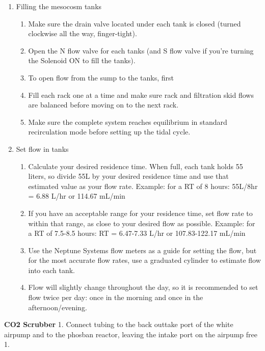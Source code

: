 \documentclass[]{book}
\providecommand{\tightlist}{%
  \setlength{\itemsep}{0pt}\setlength{\parskip}{0pt}}
\begin{document}
\begin{enumerate}
\def\labelenumi{\arabic{enumi}.}
\tightlist
\item
  Filling the mesocosm tanks

  \begin{enumerate}
  \def\labelenumii{\arabic{enumii}.}
  \tightlist
  \item
    Make sure the drain valve located under each tank is closed (turned
    clockwise all the way, finger-tight).
  \item
    Open the N flow valve for each tanks (and S flow valve if you're
    turning the Solenoid ON to fill the tanks).
  \item
    To open flow from the sump to the tanks, first
  \item
    Fill each rack one at a time and make sure rack and filtration skid
    flows are balanced before moving on to the next rack.
  \item
    Make sure the complete system reaches equilibrium in standard
    recirculation mode before setting up the tidal cycle.
  \end{enumerate}
\item
  Set flow in tanks

  \begin{enumerate}
  \def\labelenumii{\arabic{enumii}.}
  \tightlist
  \item
    Calculate your desired residence time. When full, each tank holds 55
    liters, so divide 55L by your desired residence time and use that
    estimated value as your flow rate. Example: for a RT of 8 hours:
    55L/8hr = 6.88 L/hr or 114.67 mL/min
  \item
    If you have an acceptable range for your residence time, set flow
    rate to within that range, as close to your desired flow as
    possible. Example: for a RT of 7.5-8.5 hours: RT = 6.47-7.33 L/hr or
    107.83-122.17 mL/min
  \item
    Use the Neptune Systems flow meters as a guide for setting the flow,
    but for the most accurate flow rates, use a graduated cylinder to
    estimate flow into each tank.
  \item
    Flow will slightly change throughout the day, so it is recommended
    to set flow twice per day: once in the morning and once in the
    afternoon/evening.
  \end{enumerate}
\end{enumerate}

 \textbf{CO2 Scrubber} 1. Connect tubing to the back outtake port of the
white airpump and to the phosban reactor, leaving the intake port on the
airpump free 1.
\end{document}
